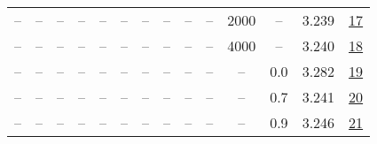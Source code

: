 \begin{table}[H]
\begin{tabular}{cccccccccccccc}
-- & -- & -- & -- & -- & -- & -- & -- & -- & -- & 2000 & -- & 3.239 & \href{https://wandb.ai/stanford-mercury/optimizer-scaling/runs/sweep-130m-21B-kron10a92elr0.001-wd0.5-b10.95-plr0.2-pis1-gn1-no-3032fa}{17} \\
-- & -- & -- & -- & -- & -- & -- & -- & -- & -- & 4000 & -- & 3.240 & \href{https://wandb.ai/stanford-mercury/optimizer-scaling/runs/sweep-130m-21B-kron05e14blr0.001-wd0.5-b10.95-plr0.2-pis1-gn1-no-e82a82}{18} \\
-- & -- & -- & -- & -- & -- & -- & -- & -- & -- & -- & 0.0 & 3.282 & \href{https://wandb.ai/stanford-mercury/optimizer-scaling/runs/sweep-130m-21B-kron5f7b04lr0.001-wd0.0-b10.95-plr0.2-pis1-gn1-no-f3b5d3}{19} \\
-- & -- & -- & -- & -- & -- & -- & -- & -- & -- & -- & 0.7 & 3.241 & \href{https://wandb.ai/stanford-mercury/optimizer-scaling/runs/sweep-130m-21B-kronc9ae15lr0.001-wd0.7-b10.95-plr0.2-pis1-gn1-no-db4b18}{20} \\
-- & -- & -- & -- & -- & -- & -- & -- & -- & -- & -- & 0.9 & 3.246 & \href{https://wandb.ai/stanford-mercury/optimizer-scaling/runs/sweep-130m-21B-kron4898eflr0.001-wd0.9-b10.95-plr0.2-pis1-gn1-no-313f60}{21} \\
\bottomrule
\end{tabular}
\end{table}

